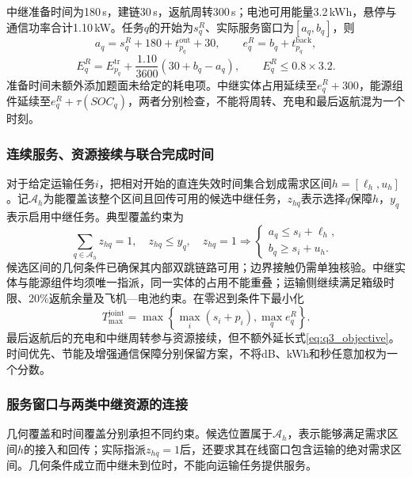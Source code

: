 \documentclass[withoutpreface,colorprint]{format}
\numberwithin{equation}{section}
\numberwithin{figure}{section}
\numberwithin{table}{section}
\begin{document}
中继准备时间为180\,s，建链30\,s，返航周转300\,s；电池可用能量3.2\,kWh，悬停与通信功率合计1.10\,kW。任务$q$的开始为$s_q^R$、实际服务窗口为$[a_q,b_q]$，则
\begin{equation}
 a_q=s_q^R+180+t_{p_q}^{\mathrm{out}}+30,
 \qquad e_q^R=b_q+t_{p_q}^{\mathrm{back}},
\label{eq:q3_lifecycle}
\end{equation}
\begin{equation}
 E_q^R=E_{p_q}^{\mathrm{tr}}+\frac{1.10}{3600}(30+b_q-a_q),
 \qquad E_q^R\le0.8\times3.2.
\label{eq:q3_relay_energy}
\end{equation}
准备时间未额外添加题面未给定的耗电项。中继实体占用延续至$e_q^R+300$，能源组件延续至$e_q^R+\tau(SOC_q)$，两者分别检查，不能将周转、充电和最后返航混为一个时刻。

\subsubsection{连续服务、资源接续与联合完成时间}
对于给定运输任务$i$，把相对开始的直连失效时间集合划成需求区间$h=[\ell_h,u_h]$。记$\mathcal A_h$为能覆盖该整个区间且回传可用的候选中继任务，$z_{hq}$表示选择$q$保障$h$，$y_q$表示启用中继任务。典型覆盖约束为
\begin{equation}
 \sum_{q\in\mathcal A_h}z_{hq}=1,\quad z_{hq}\le y_q,\quad
 z_{hq}=1\Rightarrow
 \begin{cases}a_q\le s_i+\ell_h,\\ b_q\ge s_i+u_h.\end{cases}
\label{eq:q3_cover}
\end{equation}
候选区间的几何条件已确保其内部双跳链路可用；边界接触仍需单独核验。中继实体与能源组件均须唯一指派，同一实体的占用不能重叠；运输侧继续满足箱级时限、20\%返航余量及飞机—电池约束。在零迟到条件下最小化
\begin{equation}
 T_{\max}^{\mathrm{joint}}=\max\left\{\max_i(s_i+p_i),\max_q e_q^R\right\}.
\label{eq:q3_objective}
\end{equation}
最后返航后的充电和中继周转参与资源接续，但不额外延长式\eqref{eq:q3_objective}。时间优先、节能及增强通信保障分别保留方案，不将dB、kWh和秒任意加权为一个分数。


\subsubsection{服务窗口与两类中继资源的连接}
几何覆盖和时间覆盖分别承担不同约束。候选位置属于$\mathcal A_h$，表示能够满足需求区间$h$的接入和回传；实际指派$z_{hq}=1$后，还要求其在线窗口包含运输的绝对需求区间。几何条件成立而中继未到位时，不能向运输任务提供服务。
\end{document}
